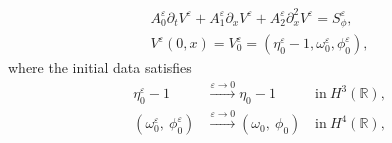 \documentclass[reqno,11pt]{amsart}
\theoremstyle{plain}
\theoremstyle{definition}
\numberwithin{equation}{section}
\begin{document}
\begin{subequations}
\label{ShallowWaterMomentumgeneralized}
\begin{gather}
\label{ShallowWaterMomentumgeneralizedConsice}
A_0^\varepsilon \partial_t V^\varepsilon + A_1^\varepsilon \partial_x V^\varepsilon + A_2^\varepsilon \partial_{x}^2 V^\varepsilon = S_\phi^\varepsilon, \\
    V^\varepsilon(0,x)=V_0^\varepsilon = (\eta_0^{\varepsilon}-1, \omega_0^{\varepsilon}, \phi_0^{\varepsilon}), 
\end{gather}
\end{subequations}
where the initial data satisfies 
\begin{equation}
    \label{Vsc_initial}
    \begin{aligned}
    \eta_0^\varepsilon - 1 & \xrightarrow{\varepsilon\to 0} \eta_0-1  \qquad  & \text{in} ~ H^3(\mathbb R), \\
    (\omega_0^{\varepsilon}, ~ \phi_0^{\varepsilon}) & \xrightarrow{\varepsilon\to 0} (\omega_0, ~ \phi_0) & \text{in} ~ H^4(\mathbb R),
    \end{aligned}
\end{equation}
\end{document}
